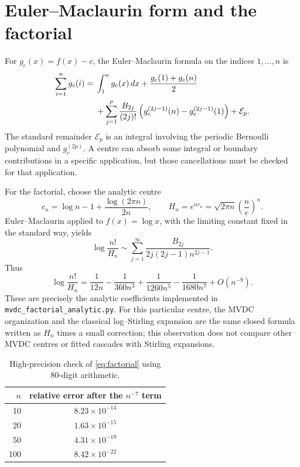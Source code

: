 \documentclass[11pt,a4paper]{article}
\begin{document}
\section{Euler--Maclaurin form and the factorial}

For \(g_c(x)=f(x)-c\), the Euler--Maclaurin formula on the indices
\(1,\ldots,n\) is
\begin{align}
  \sum_{i=1}^{n}g_c(i)
  ={}&
  \int_1^n g_c(x)\,dx
  +\frac{g_c(1)+g_c(n)}2 \notag\\
  &+\sum_{j=1}^{p}
  \frac{B_{2j}}{(2j)!}
  \left(g_c^{(2j-1)}(n)-g_c^{(2j-1)}(1)\right)
  +\mathcal E_p . \label{eq:EM}
\end{align}
The standard remainder \(\mathcal E_p\) is an integral involving the
periodic Bernoulli polynomial and \(g_c^{(2p)}\).  A centre can absorb
some integral or boundary contributions in a specific application, but
those cancellations must be checked for that application.

For the factorial, choose the analytic centre
\[
  c_n=\log n-1+\frac{\log(2\pi n)}{2n},\qquad
  H_n=e^{nc_n}=\sqrt{2\pi n}\left(\frac ne\right)^n .
\]
Euler--Maclaurin applied to \(f(x)=\log x\), with the limiting constant
fixed in the standard way, yields
\begin{equation}\label{eq:factorial}
  \log\frac{n!}{H_n}
  \sim
  \sum_{j=1}^{\infty}
  \frac{B_{2j}}{2j(2j-1)n^{2j-1}}.
\end{equation}
Thus
\[
  \log\frac{n!}{H_n}
  =
  \frac1{12n}-\frac1{360n^3}
  +\frac1{1260n^5}-\frac1{1680n^7}
  +O(n^{-9}).
\]
These are precisely the analytic coefficients implemented in
\texttt{mvdc\_factorial\_analytic.py}.  For this particular centre, the
MVDC organization and the classical log--Stirling expansion are the
same closed formula written as \(H_n\) times a small correction; this
observation does not compare other MVDC centres or fitted cascades with
Stirling expansions.

\begin{table}[ht]
\centering
\begin{tabular}{rc}
\toprule
\(n\) & relative error after the \(n^{-7}\) term \\
\midrule
10  & \(8.23\times10^{-13}\) \\
20  & \(1.63\times10^{-15}\) \\
50  & \(4.31\times10^{-19}\) \\
100 & \(8.42\times10^{-22}\) \\
\bottomrule
\end{tabular}
\caption{High-precision check of \eqref{eq:factorial} using 80-digit arithmetic.}
\end{table}
\end{document}

